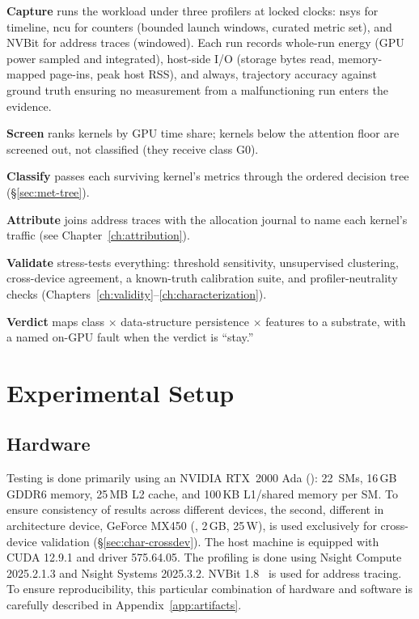 \textbf{Capture} runs the workload under three profilers at locked clocks: nsys for timeline, ncu for counters (bounded launch windows, curated metric set), and NVBit for address traces (windowed). Each run records whole-run energy (GPU power sampled and integrated), host-side I/O (storage bytes read, memory-mapped page-ins, peak host RSS), and always, trajectory accuracy against ground truth ensuring no measurement from a malfunctioning run enters the evidence.

\textbf{Screen} ranks kernels by GPU time share; kernels below the attention floor are screened out, not classified (they receive class G0).

\textbf{Classify} passes each surviving kernel’s metrics through the ordered decision tree (\S\ref{sec:met-tree}).

\textbf{Attribute} joins address traces with the allocation journal to name each kernel’s traffic (see Chapter~\ref{ch:attribution}).

\textbf{Validate} stress-tests everything: threshold sensitivity, unsupervised clustering, cross-device agreement, a known-truth calibration suite, and profiler-neutrality checks (Chapters~\ref{ch:validity}--\ref{ch:characterization}).

\textbf{Verdict} maps class $\times$ data-structure persistence $\times$ features to a substrate, with a named on-GPU fault when the verdict is ``stay.''

\section{Experimental Setup}
\label{sec:met-setup}

\subsection{Hardware}

Testing is done primarily using an NVIDIA RTX~2000 Ada (): 22~SMs, 16\,GB GDDR6 memory, 25\,MB L2 cache, and 100\,KB L1/shared memory per SM. To ensure consistency of results across different devices, the second, different in architecture device, GeForce MX450 (, 2\,GB, 25\,W), is used exclusively for cross-device validation (\S\ref{sec:char-crossdev}). The host machine is equipped with CUDA 12.9.1 and driver 575.64.05. The profiling is done using Nsight Compute 2025.2.1.3 and Nsight Systems 2025.3.2. NVBit 1.8~\cite{villa2019nvbit} is used for address tracing. To ensure reproducibility, this particular combination of hardware and software is carefully described in Appendix~\ref{app:artifacts}.

